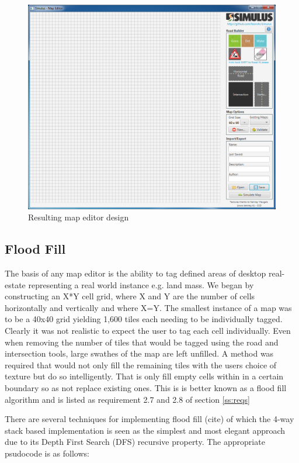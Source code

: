 \begin{figure}[h]
	\begin{center}
			\includegraphics[scale=0.45]{img/mapEditorFinal.png}
		\caption{Resulting map editor design}
		\label{fig:finalMapEditor}
	\end{center}
\end{figure}

\subsection{Flood Fill}
The basis of any map editor is the ability to tag defined areas of desktop real-estate representing a real world instance e.g. land mass. We began by constructing an X*Y cell grid, where X and Y are the number of cells horizontally and vertically and where X=Y. The smallest instance of a map was to be a 40x40 grid yielding 1,600 tiles each needing to be individually tagged. Clearly it was not realistic to expect the user to tag each cell individually. Even when removing the number of tiles that would be tagged using the road and intersection tools, large swathes of the map are left unfilled.  
A method was required that would not only fill the remaining tiles with the users choice of texture but do so intelligently. That is only fill empty cells within in a certain boundary so as not replace existing ones.  This is is better known as a flood fill algorithm and is listed as requirement 2.7 and 2.8 of section \ref{ss:reqs}

There are several techniques for implementing flood fill (cite) of which the 4-way stack based implementation is seen as the simplest and most elegant approach due to its Depth First Search (DFS) recursive property.  The appropriate psudocode is as follows:

